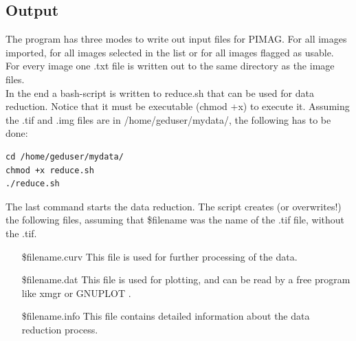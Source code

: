 \subsection{Output}
The program has three modes to write out input files for PIMAG. For all images imported, for all images selected in the list or for all images flagged as usable. \\
For every image one .txt file is written out to the same directory as the image files. \\
In the end a bash-script is written to reduce.sh that can be used for data reduction. Notice that it must be executable (chmod +x) to execute it. Assuming the .tif and .img files are in /home/geduser/mydata/, the following has to be done: \\

\begin{lstlisting}
cd /home/geduser/mydata/
chmod +x reduce.sh
./reduce.sh 
\end{lstlisting}

The last command starts the data reduction. The script creates (or overwrites!) the following files, assuming that \$filename was the name of the .tif file, without the .tif.  

\begin{itemize}
\item [\$filename.curv] This file is used for further processing of the data. 
\item [\$filename.dat] This file is used for plotting,  and can be read by a free program like xmgr \cite{xmgr} or GNUPLOT \cite{gnuplot}.
\item [\$filename.info] This file contains detailed information about the data reduction process.
\end{itemize}




